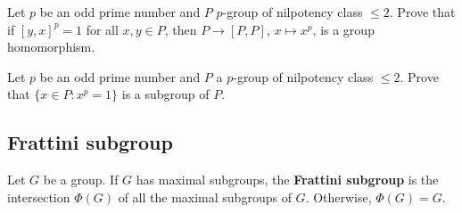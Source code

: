 
\begin{exercise}
\label{xca:class2}
Let $p$ be an odd prime number and 
$P$ $p$-group of nilpotency class $\leq2$. 
Prove that if $[y,x]^p=1$ for all $x,y\in P$, then
$P\to [P,P]$,
$x\mapsto x^p$, is a group homomorphism. 
\end{exercise}


\begin{exercise}
\label{xca:class2_torsion}
Let $p$ be an odd prime number and 
$P$ a $p$-group of nilpotency class $\leq2$. 
Prove that $\{x\in P:x^p=1\}$ is a subgroup of $P$.
\end{exercise}



\subsection{Frattini subgroup}

\begin{definition}
Let $G$ be a group. If $G$ has maximal subgroups, 
the \textbf{Frattini subgroup} is the intersection 
$\Phi(G)$ of all the maximal subgroups of $G$. 
Otherwise, 
$\Phi(G)=G$. 
\end{definition}

